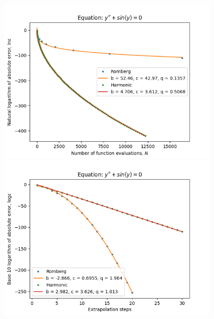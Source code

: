 \begin{figure}[H]
\centering
\begin{minipage}{0.45\textwidth}
\centering
\includegraphics[scale=0.45]{emr_plots/oscillation_hp_trend.png}
\end{minipage}
\begin{minipage}{0.45\textwidth}
\centering
\includegraphics[scale=0.45]{emr_plots/oscillation_hp_steps.png}
\end{minipage}
\end{figure}

